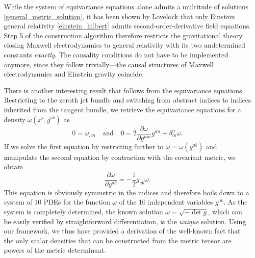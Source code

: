While the system of equivariance equations alone admits a multitude of solutions \eqref{general_metric_solution}, it has been shown by Lovelock \cite{Lovelock_1969,Lovelock_1971,Lovelock_1972} that only Einstein general relativity \eqref{einstein_hilbert} admits second-order-derivative field equations. Step 5 of the construction algorithm therefore restricts the gravitational theory closing Maxwell electrodynamics to general relativity with its two undetermined constants \emph{exactly}. The causality conditions do not have to be implemented anymore, since they follow trivially---the causal structures of Maxwell electrodynamics and Einstein gravity coincide.

There is another interesting result that follows from the equivariance equations. Restricting to the zeroth jet bundle and switching from abstract indices to indices inherited from the tangent bundle, we retrieve the equivariance equations for a density $\omega(x^i,g^{ab})$ as
\begin{equation}\label{metric_order_0_eq}
  0 = \omega_{,m}\quad\text{and}\quad 0 = 2\frac{\partial\omega}{\partial g^{am}} g^{an} + \delta^n_m \omega.
\end{equation}
If we solve the first equation by restricting further to $\omega=\omega(g^{ab})$ and manipulate the second equation by contraction with the covariant metric, we obtain
\begin{equation}
  \frac{\partial\omega}{\partial g^{ab}} = -\frac{1}{2} g_{ab} \omega.
\end{equation}
This equation is obviously symmetric in the indices and therefore boils down to a system of 10 PDEs for the function $\omega$ of the 10 independent variables $g^{ab}$. As the system is completely determined, the known solution $\omega=\sqrt{-\operatorname{det}g}$, which can be easily verified by straightforward differentiation, is the \emph{unique} solution. Using our framework, we thus have provided a derivation of the well-known fact that the only scalar densities that can be constructed from the metric tensor are powers of the metric determinant.

